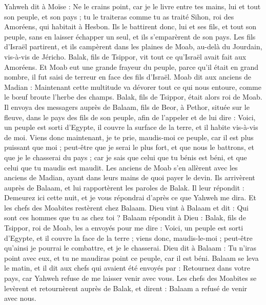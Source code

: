 \begin{multicols}{2}
Yahweh dit à Moïse : Ne le crains point, car je le livre entre tes mains, lui et tout son peuple, et son pays ; tu le traiteras comme tu as traité Sihon, roi des Amoréens, qui habitait à Hesbon.
Ils le battirent donc, lui et ses fils, et tout son peuple, sans en laisser échapper un seul, et ils s’emparèrent de son pays.
\VerseOne{}Les fils d'Israël partirent, et ils campèrent dans les plaines de Moab, au-delà du Jourdain, vis-à-vis de Jéricho.
Balak, fils de Tsippor, vit tout ce qu'Israël avait fait aux Amoréens.
Et Moab eut une grande frayeur du peuple, parce qu'il était en grand nombre, il fut saisi de terreur en face des fils d'Israël.
Moab dit aux anciens de Madian : Maintenant cette multitude va dévorer tout ce qui nous entoure, comme le bœuf broute l'herbe des champs. Balak, fils de Tsippor, était alors roi de Moab.
Il envoya des messagers auprès de Balaam, fils de Beor, à Pethor, située sur le fleuve, dans le pays des fils de son peuple, afin de l'appeler et de lui dire : Voici, un peuple est sorti d'Egypte, il couvre la surface de la terre, et il habite vis-à-vis de moi.
Viens donc maintenant, je te prie, maudis-moi ce peuple, car il est plus puissant que moi ; peut-être que je serai le plus fort, et que nous le battrons, et que je le chasserai du pays ; car je sais que celui que tu bénis est béni, et que celui que tu maudis est maudit.
Les anciens de Moab s'en allèrent avec les anciens de Madian, ayant dans leurs mains de quoi payer le devin. Ils arrivèrent auprès de Balaam, et lui rapportèrent les paroles de Balak.
Il leur répondit : Demeurez ici cette nuit, et je vous répondrai d’après ce que Yahweh me dira. Et les chefs des Moabites restèrent chez Balaam.
Dieu vint à Balaam et dit : Qui sont ces hommes que tu as chez toi ?
Balaam répondit à Dieu : Balak, fils de Tsippor, roi de Moab, les a envoyés pour me dire :
Voici, un peuple est sorti d'Egypte, et il couvre la face de la terre ; viens donc, maudis-le-moi ; peut-être qu’ainsi je pourrai le combattre, et je le chasserai.
Dieu dit à Balaam : Tu n'iras point avec eux, et tu ne maudiras point ce peuple, car il est béni.
Balaam se leva le matin, et il dit aux chefs qui avaient été envoyés par : Retournez dans votre pays, car Yahweh refuse de me laisser venir avec vous.
Les chefs des Moabites se levèrent et retournèrent auprès de Balak, et dirent : Balaam a refusé de venir avec nous.

\end{multicols}
